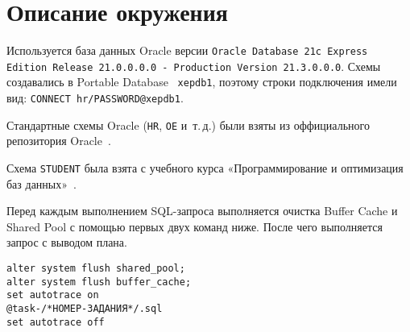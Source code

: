 

\chapter*{Описание окружения} %


Используется база данных Oracle версии \texttt{Oracle Database 21c Express Edition Release 21.0.0.0.0 - Production Version 21.3.0.0.0}.
Схемы создавались в Portable Database~\cite{PDB} \texttt{xepdb1}, поэтому строки подключения имели вид: \texttt{CONNECT hr/PASSWORD@xepdb1}.

Стандартные схемы Oracle (\texttt{HR}, \texttt{OE} и~т.\,д.) были взяты из оффициального репозитория Oracle~\cite{SampleSchemas}.

Схема \texttt{STUDENT} была взята с учебного курса «Программирование и оптимизация баз данных»~\cite{StudentSchema}.

Перед каждым выполнением SQL-запроса выполняется очистка Buffer Cache и Shared Pool с помощью первых двух команд ниже.
После чего выполняется запрос с выводом плана.

\begin{verbatim}
alter system flush shared_pool;
alter system flush buffer_cache;
set autotrace on
@task-/*НОМЕР-ЗАДАНИЯ*/.sql
set autotrace off
\end{verbatim}